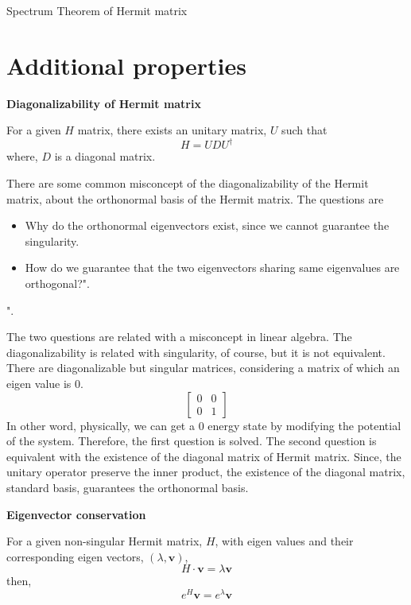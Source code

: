 \begin{theorem}{Spectrum Theorem of Hermit matrix}
    \label{theorem:hermit_spectrum}
\end{theorem}
\section{Additional properties}

\begin{theorem}{\textbf{Diagonalizability of Hermit matrix}}

    For a given $H$ matrix, there exists an unitary matrix, $U$ such that 
    \begin{equation*}
        H = U D U^\dagger
    \end{equation*}
    where, $D$ is a diagonal matrix.
\end{theorem}

There are some common misconcept of the diagonalizability of the Hermit matrix,
about the orthonormal basis of the Hermit matrix.
The questions are

\begin{itemize}
    \item Why do the orthonormal eigenvectors exist, since we cannot guarantee the singularity.
    \item How do we guarantee that the two eigenvectors sharing 
    same eigenvalues are orthogonal?".
\end{itemize}".

The two questions are related with a misconcept in linear algebra.
The diagonalizability is related with singularity, of course, 
but it is not equivalent. 
There are diagonalizable but singular matrices, considering a matrix of which an eigen value is 0.
\begin{equation*}
    \begin{bmatrix}
        0 & 0\\
        0 & 1
    \end{bmatrix}
\end{equation*}
In other word, physically, we can get a 0 energy state by modifying the potential of the system. 
Therefore, the first question is solved.
The second question is equivalent with the existence of the diagonal matrix
of Hermit matrix. Since, the unitary operator preserve the inner product, 
the existence of the diagonal matrix, standard basis, guarantees the orthonormal basis.
 

\begin{theorem}{\textbf{Eigenvector conservation}}

    For a given non-singular Hermit matrix, $H$, with eigen values and their corresponding eigen vectors, $(\lambda, \mathbf{v})$,
    \begin{equation*}
        H \cdot \mathbf{v} = \lambda \mathbf{v}
    \end{equation*}
    then, 
    \begin{equation*}
        e^{H} \mathbf{v} = e^{\lambda }\mathbf{v}
    \end{equation*}
\end{theorem}

